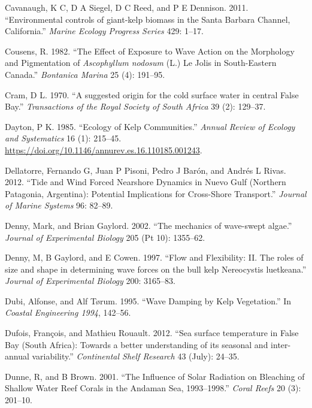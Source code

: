 \documentclass[
  a4paper,
]{article}
\begin{document}
\leavevmode\hypertarget{ref-Cavanaugh2011-ib}{}%
Cavanaugh, K C, D A Siegel, D C Reed, and P E Dennison. 2011.
``Environmental controls of giant-kelp biomass in the Santa Barbara
Channel, California.'' \emph{Marine Ecology Progress Series} 429: 1--17.

\leavevmode\hypertarget{ref-Cousens1982-ck}{}%
Cousens, R. 1982. ``The Effect of Exposure to Wave Action on the
Morphology and Pigmentation of \emph{Ascophyllum nodosum} (L.) Le Jolis
in South-Eastern Canada.'' \emph{Bontanica Marina} 25 (4): 191--95.

\leavevmode\hypertarget{ref-Cram1970-jw}{}%
Cram, D L. 1970. ``A suggested origin for the cold surface water in
central False Bay.'' \emph{Transactions of the Royal Society of South
Africa} 39 (2): 129--37.

\leavevmode\hypertarget{ref-Dayton1985}{}%
Dayton, P K. 1985. ``Ecology of Kelp Communities.'' \emph{Annual Review
of Ecology and Systematics} 16 (1): 215--45.
\url{https://doi.org/10.1146/annurev.es.16.110185.001243}.

\leavevmode\hypertarget{ref-Dellatorre2012}{}%
Dellatorre, Fernando G, Juan P Pisoni, Pedro J Barón, and Andrés L
Rivas. 2012. ``Tide and Wind Forced Nearshore Dynamics in Nuevo Gulf
(Northern Patagonia, Argentina): Potential Implications for Cross-Shore
Transport.'' \emph{Journal of Marine Systems} 96: 82--89.

\leavevmode\hypertarget{ref-Denny2002}{}%
Denny, Mark, and Brian Gaylord. 2002. ``The mechanics of wave-swept
algae.'' \emph{Journal of Experimental Biology} 205 (Pt 10): 1355--62.

\leavevmode\hypertarget{ref-Denny1997}{}%
Denny, M, B Gaylord, and E Cowen. 1997. ``Flow and Flexibility: II. The
roles of size and shape in determining wave forces on the bull kelp
Nereocystis luetkeana.'' \emph{Journal of Experimental Biology} 200:
3165--83.

\leavevmode\hypertarget{ref-Dubi1995}{}%
Dubi, Alfonse, and Alf Tørum. 1995. ``Wave Damping by Kelp Vegetation.''
In \emph{Coastal Engineering 1994}, 142--56.

\leavevmode\hypertarget{ref-Dufois2012-vy}{}%
Dufois, François, and Mathieu Rouault. 2012. ``Sea surface temperature
in False Bay (South Africa): Towards a better understanding of its
seasonal and inter-annual variability.'' \emph{Continental Shelf
Research} 43 (July): 24--35.

\leavevmode\hypertarget{ref-Dunne2001}{}%
Dunne, R, and B Brown. 2001. ``The Influence of Solar Radiation on
Bleaching of Shallow Water Reef Corals in the Andaman Sea, 1993--1998.''
\emph{Coral Reefs} 20 (3): 201--10.
\end{document}
